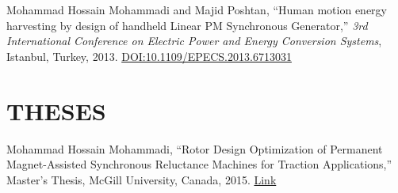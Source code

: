 Mohammad Hossain Mohammadi and Majid Poshtan, ``Human motion energy harvesting by design of handheld Linear PM Synchronous Generator,'' \textit{3rd International Conference on Electric Power and Energy Conversion Systems}, Istanbul, Turkey,  2013. \n\href{https://doi.org/10.1109/EPECS.2013.6713031}{DOI:10.1109/EPECS.2013.6713031}


\section{THESES}

Mohammad Hossain Mohammadi, ``Rotor Design Optimization of Permanent Magnet-Assisted Synchronous Reluctance Machines for Traction Applications,'' Master's Thesis, McGill University, Canada, 2015. \n\href{http://digitool.library.mcgill.ca/R/-?func=dbin-jump-full&object_id=139232&silo_library=GEN01}{Link}


